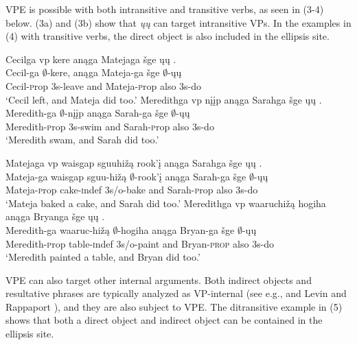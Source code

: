 \documentclass[output=paper]{LSP/langsci}
\begin{document}
VPE is possible with both intransitive and transitive verbs, as seen in (3-4) below. (3a) and (3b) show that \emph{ųų} can target intransitive VPs. In the examples in (4) with transitive verbs, the direct object is also included in the ellipsis site.

\begin{exe}
\ex
\begin{xlist}
\ex
\glll Cecilga {\ob}{vp} kere{\cb} anąga Matejaga šge {\ob}ųų{\cb} .\\
Cecil-ga {} $\emptyset$-kere, anąga Mateja-ga šge $\emptyset$-ųų\\
Cecil-{\textsc prop} {} {\textsc 3s}-leave and Mateja-{\textsc prop} also {\textsc 3s}-do\\
\trans `Cecil left, and Mateja did too.'
\ex
\glll Meredithga {\ob}{vp} nįįp{\cb} anąga Sarahga šge {\ob}ųų{\cb} .\\
Meredith-ga {} $\emptyset$-nįįp anąga Sarah-ga šge $\emptyset$-ųų\\
Meredith-{\textsc prop} {} {\textsc 3s}-swim and Sarah-{\textsc prop} also {\textsc 3s}-do\\
\trans `Meredith swam, and Sarah did too.'
\end{xlist}
\end{exe}

\begin{exe}
\ex
\begin{xlist}
\ex
\glll Matejaga {\ob}{vp} {waisgap sguuhižą} rook'į{\cb} anąga Sarahga šge {\ob}ųų{\cb} .\\
Mateja-ga {} {waisgap sguu-hižą} $\emptyset$-rook'į anąga Sarah-ga šge $\emptyset$-ųų\\
Mateja-{\textsc prop} {} cake-{\textsc indef} {\textsc 3s/o}-bake and Sarah-{\textsc prop} also {\textsc 3s}-do\\
\trans `Mateja baked a cake, and Sarah did too.'
\ex
\glll Meredithga {\ob}{vp} waaruchižą hogiha{\cb} anąga Bryanga šge {\ob}ųų{\cb} .\\
Meredith-ga {} waaruc-hižą $\emptyset$-hogiha anąga Bryan-ga šge $\emptyset$-ųų\\
Meredith-{\textsc prop} {} table-{\textsc indef} {\textsc 3s/o}-paint and Bryan-\textsc{prop} also {\textsc 3s}-do\\
\trans `Meredith painted a table, and Bryan did too.'
\end{xlist}
\end{exe}

VPE can also target other internal arguments. Both indirect objects and resultative phrases are typically analyzed as VP-internal (see e.g., \citealt{Larson1988} and Levin and Rappaport \citealt{Hovav1995}), and they are also subject to VPE. The ditransitive example in (5) shows that both a direct object and indirect object can be contained in the ellipsis site.
\end{document}
